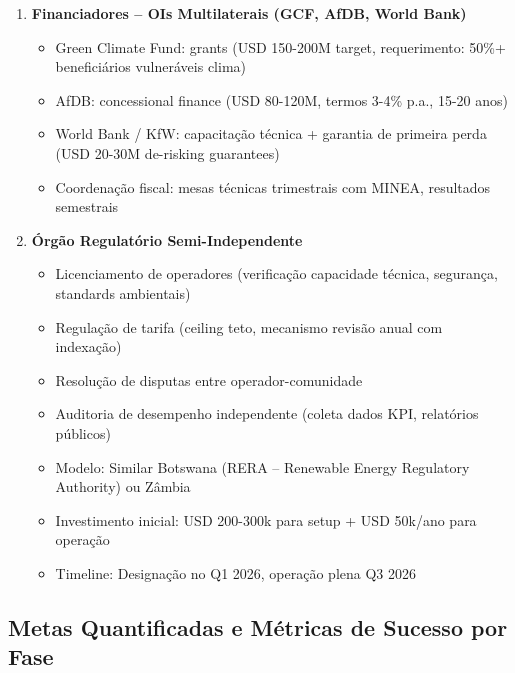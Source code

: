 \documentclass[12pt, a4paper]{article}
\begin{document}
\begin{enumerate}
\item \textbf{Financiadores -- OIs Multilaterais (GCF, AfDB, World Bank)}
   \begin{itemize}
   \item Green Climate Fund: grants (USD 150-200M target, requerimento: 50\%+ beneficiários vulneráveis clima)
   \item AfDB: concessional finance (USD 80-120M, termos 3-4\% p.a., 15-20 anos)
   \item World Bank / KfW: capacitação técnica + garantia de primeira perda (USD 20-30M de-risking guarantees)
   \item Coordenação fiscal: mesas técnicas trimestrais com MINEA, resultados semestrais
   \end{itemize}

\item \textbf{Órgão Regulatório Semi-Independente}
   \begin{itemize}
   \item Licenciamento de operadores (verificação capacidade técnica, segurança, standards ambientais)
   \item Regulação de tarifa (ceiling teto, mecanismo revisão anual com indexação)
   \item Resolução de disputas entre operador-comunidade
   \item Auditoria de desempenho independente (coleta dados KPI, relatórios públicos)
   \item Modelo: Similar Botswana (RERA -- Renewable Energy Regulatory Authority) ou Zâmbia
   \item Investimento inicial: USD 200-300k para setup + USD 50k/ano para operação 
   \item Timeline: Designação no Q1 2026, operação plena Q3 2026
   \end{itemize}
\end{enumerate}

\subsection{Metas Quantificadas e Métricas de Sucesso por Fase}
\end{document}
